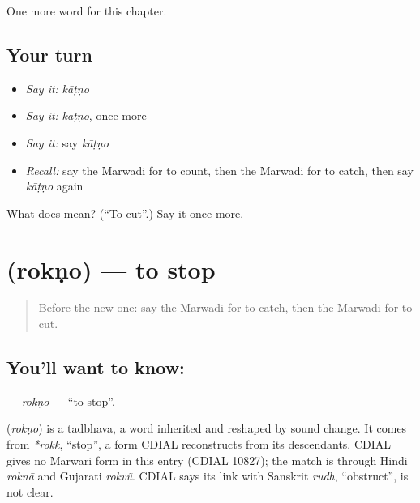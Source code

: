 \begin{grammarlens}[title={What you've built}]
One more word for this chapter.
\end{grammarlens}

\subsection*{Your turn}
\begin{itemize}
\raggedright
  \item \emph{Say it:} \emph{kāṭṇo}
  \item \emph{Say it:} \emph{kāṭṇo}, once more
  \item \emph{Say it:} say \emph{kāṭṇo}
  \item \emph{Recall:} say the Marwadi for to count, then the Marwadi for to catch, then say \emph{kāṭṇo} again
\end{itemize}

\begin{tcolorbox}[breakable,colback=teal!4,colframe=teal!35!black,title={Before you move on}]
What does  mean? (\textquotedblleft{}To cut\textquotedblright{}.) Say it once more.
\end{tcolorbox}
\section[\texorpdfstring{\mw{रोकणो} (rokṇo)}{रोकणो (rokṇo)}]{ (rokṇo) — to stop}

\label{lesson:MW-C56-rokno}



\begin{quote}
Before the new one: say the Marwadi for to catch, then the Marwadi for to cut.
\end{quote}

\subsection*{You'll want to know: }
\textbf{} — \emph{rokṇo} — \textquotedblleft{}to stop\textquotedblright{}.

\begin{cousinweb}
\textbf{} (\emph{rokṇo}) is a tadbhava, a word inherited and reshaped by sound change. It comes from \emph{*rokk}, \textquotedblleft{}stop\textquotedblright{}, a form CDIAL reconstructs from its descendants. CDIAL gives no Marwari form in this entry (CDIAL 10827); the match is through Hindi \emph{roknā} and Gujarati \emph{rokvũ}. CDIAL says its link with Sanskrit \emph{rudh}, \textquotedblleft{}obstruct\textquotedblright{}, is not clear.
\end{cousinweb}

